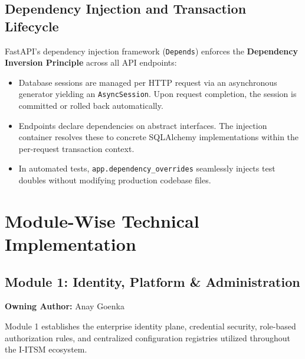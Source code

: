 \documentclass[11pt,a4paper,oneside]{report}
\begin{document}
\section{Dependency Injection and Transaction Lifecycle}
\label{sec:arch_di}
FastAPI's dependency injection framework (\texttt{Depends}) enforces the \textbf{Dependency Inversion Principle} across all API endpoints:
\begin{itemize}
    \item Database sessions are managed per HTTP request via an asynchronous generator yielding an \texttt{AsyncSession}. Upon request completion, the session is committed or rolled back automatically.
    \item Endpoints declare dependencies on abstract interfaces. The injection container resolves these to concrete SQLAlchemy implementations within the per-request transaction context.
    \item In automated tests, \texttt{app.dependency\_overrides} seamlessly injects test doubles without modifying production codebase files.
\end{itemize}


\chapter{Module-Wise Technical Implementation}
\label{ch:modules}

\section{Module 1: Identity, Platform \& Administration}
\label{sec:module_m1}
\textbf{Owning Author:} Anay Goenka

Module 1 establishes the enterprise identity plane, credential security, role-based authorization rules, and centralized configuration registries utilized throughout the I-ITSM ecosystem.
\end{document}
